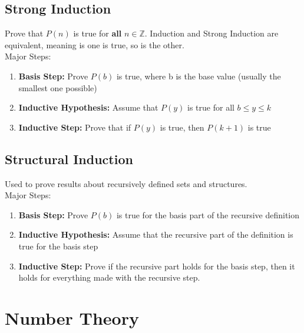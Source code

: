\documentclass[letter]{article}
\begin{document}
\begin{multicols}{2}
	\subsection{Strong Induction}
	Prove that $P(n)$ is true for \textbf{all} $n \in \mathbb{Z}$. Induction and Strong Induction are
	equivalent, meaning is one is true, so is the other.\\
	Major Steps:
	\begin{enumerate}
		\item \textbf{Basis Step:} Prove $P(b)$ is true, where b is the base value (usually the smallest one possible)
		\item \textbf{Inductive Hypothesis:} Assume that $P(y)$ is true for all $b \leq y \leq k$
		\item \textbf{Inductive Step:} Prove that if $P(y)$ is true, then $P(k + 1)$ is true
	\end{enumerate}

	\subsection{Structural Induction}
	Used to prove results about recursively defined sets and structures.\\
	Major Steps:
	\begin{enumerate}
		\item \textbf{Basis Step:} Prove $P(b)$ is true for the basis part of the recursive definition
		\item \textbf{Inductive Hypothesis:} Assume that the recursive part of the definition is true for the basis step
		\item \textbf{Inductive Step:} Prove if the recursive part holds for the basis step, then it holds for everything made with the recursive step.
	\end{enumerate}

	\section{Number Theory}


\end{multicols}
\end{document}
